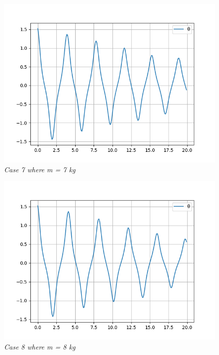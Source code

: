         \begin{figure}[H]
            \centering
            \includegraphics{Appendix/RExpPictures/A/am7.png}
            \caption{\textit{Case 7 where m = 7 kg}}
            \label{}
        \end{figure}
            
        \begin{figure}[H]
            \centering
            \includegraphics{Appendix/RExpPictures/A/am8.png}
            \caption{\textit{Case 8 where m = 8 kg}}
            \label{}
        \end{figure}
            
